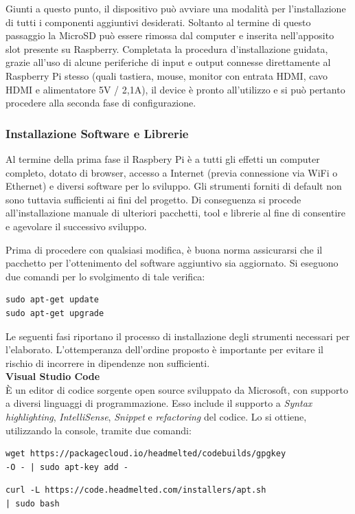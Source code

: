 \documentclass[12pt]{article}
\begin{document}
Giunti a questo punto, il dispositivo può avviare una modalità per l'installazione di tutti i componenti aggiuntivi desiderati. Soltanto al termine di questo passaggio la MicroSD può essere rimossa dal computer e inserita nell'apposito slot presente su Raspberry. Completata la procedura d'installazione guidata, grazie all'uso di alcune periferiche di input e output connesse direttamente al Raspberry Pi stesso (quali tastiera, mouse, monitor con entrata HDMI, cavo HDMI e alimentatore 5V / 2,1A), il device è pronto all'utilizzo e si può pertanto procedere alla seconda fase di configurazione.

\subsubsection{Installazione Software e Librerie}

Al termine della prima fase il Raspbery Pi è a tutti gli effetti un computer completo, dotato di browser, accesso a Internet (previa connessione via WiFi o Ethernet) e diversi software per lo sviluppo. Gli strumenti forniti di default non sono tuttavia sufficienti ai fini del progetto. Di conseguenza si procede all'installazione manuale di ulteriori pacchetti, tool e librerie al fine di consentire e agevolare il successivo sviluppo.

Prima di procedere con qualsiasi modifica, è buona norma assicurarsi che il pacchetto per l'ottenimento del software aggiuntivo sia aggiornato. Si eseguono due comandi per lo svolgimento di tale verifica:
\begin{lstlisting}
sudo apt-get update
sudo apt-get upgrade
\end{lstlisting}

Le seguenti fasi riportano il processo di installazione degli strumenti necessari per l'elaborato. L'ottemperanza dell'ordine proposto è importante per evitare il rischio di incorrere in dipendenze non sufficienti.\\

\textbf{Visual Studio Code}\\
È un editor di codice sorgente open source sviluppato da Microsoft, con supporto a diversi linguaggi di programmazione. Esso include il supporto a \textit{Syntax highlighting}, \textit{IntelliSense}, \textit{Snippet} e \textit{refactoring} del codice. Lo si ottiene, utilizzando la console, tramite due comandi:
\begin{lstlisting}
wget https://packagecloud.io/headmelted/codebuilds/gpgkey 
-O - | sudo apt-key add -
\end{lstlisting}
\begin{lstlisting}
curl -L https://code.headmelted.com/installers/apt.sh
| sudo bash
\end{lstlisting}
\end{document}
